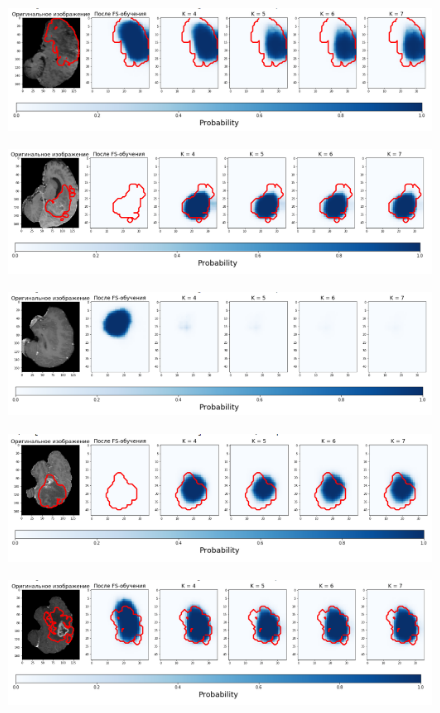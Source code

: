 \begin{figure}[h!] 
  \center
  \includegraphics [scale=0.7] {images/good_13.png}
\end{figure}

\begin{figure}[h!] 
  \center
  \includegraphics [scale=0.7] {images/good_14.png}
\end{figure}

\begin{figure}[h!] 
  \center
  \includegraphics [scale=0.7] {images/good_15.png}
\end{figure}


\begin{figure}[h!] 
  \center
  \includegraphics [scale=0.7] {images/good_16.png}
\end{figure}


\begin{figure}[h!] 
  \center
  \includegraphics [scale=0.7] {images/good_17.png}
 \end{figure} 
  
